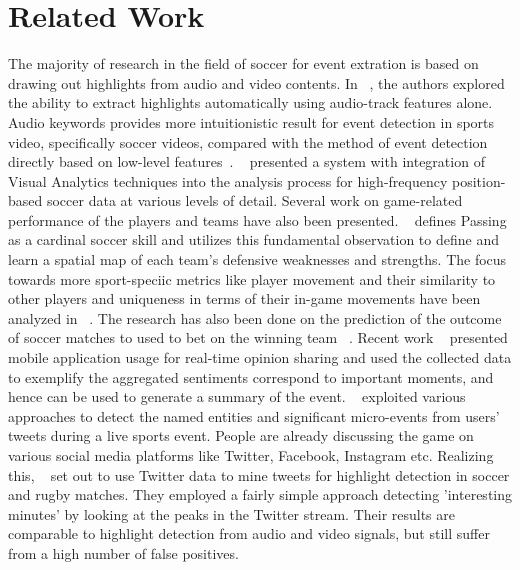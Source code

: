 \documentclass[11pt,letterpaper]{article}
\begin{document}
\section{Related Work}
The majority of research in the field of soccer for event extration is based on drawing out highlights from audio and video contents. In ~\cite{rui2000automatically}, the authors explored the ability to extract highlights automatically using audio-track features alone. 
Audio keywords provides more intuitionistic
result for event detection in sports video, specifically soccer videos, compared with
the method of event detection directly based on low-level
features~\cite{xu2003creating}. ~\cite{sacha2014feature} presented a system with integration of Visual Analytics techniques into the analysis process for high-frequency position-based soccer data at various levels of detail. Several work on game-related performance of the players and teams have also been presented. ~\cite{bojinov2016pressing} defines Passing as a cardinal soccer skill and utilizes this fundamental observation to define and learn a spatial map of each team’s defensive weaknesses and strengths. The focus towards more sport-speciic metrics like player movement and their similarity to other players  and uniqueness in terms of their in-game movements have been analyzed in ~\cite{gyarmati2016analyzing}.
The research has also been done on the prediction of the outcome of soccer matches to used to bet on the winning team ~\cite{van2012soccer}.
Recent work ~\cite{sahami2011real} presented mobile application usage for real-time opinion sharing and used the collected data to exemplify the aggregated sentiments
correspond to important moments, and hence can be used to
generate a summary of the event. ~\cite{choudhury2011extracting} exploited various approaches to
detect the named entities and significant micro-events from users’
tweets during a live sports event.
People are already discussing the game on various social media platforms like Twitter, Facebook, Instagram etc. Realizing this, ~\cite{lanagan2011using} set out to use Twitter data to mine tweets for highlight detection in soccer and rugby matches. They employed a fairly simple approach detecting 'interesting minutes' by looking at the peaks in the Twitter stream. Their results are comparable to highlight detection from audio and video signals, but still suffer from a high number of false positives.\\
\end{document}
